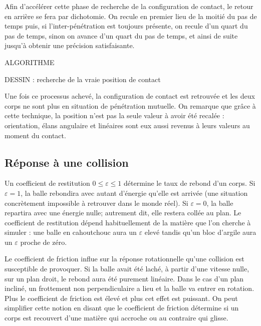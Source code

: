 Afin d'accélérer cette phase de recherche de la configuration de
contact, le retour en arrière se fera par dichotomie. On recule en
premier lieu de la moitié du pas de temps puis, si l'inter-pénétration
est toujours présente, on recule d'un quart du pas de temps, sinon on
avance d'un quart du pas de temps, et ainsi de suite jusqu'à obtenir
une précision satisfaisante.

ALGORITHME

DESSIN : recherche de la vraie position de contact

Une fois ce processus achevé, la configuration de contact est
retrouvée et les deux corps ne sont plus en situation de pénétration
mutuelle. On remarque que grâce à cette technique, la position n'est
pas la seule valeur à avoir été recalée : orientation, élans angulaire
et linéaires sont eux aussi revenus à leurs valeurs au moment du
contact.

\subsection{Réponse à une collision}

Un coefficient de restitution $0 \leq \varepsilon \leq 1$ détermine le
taux de rebond d'un corps. Si $\varepsilon = 1$, la balle rebondira
avec autant d'énergie qu'elle est arrivée (une situation concrètement
impossible à retrouver dans le monde réel). Si $\varepsilon = 0$, la
balle repartira avec une énergie nulle; autrement dit, elle restera
collée au plan. Le coefficient de restitution dépend habituellement de
la matière que l'on cherche à simuler : une balle en cahoutchouc aura
un $\varepsilon$ elevé tandis qu'un bloc d'argile aura un
$\varepsilon$ proche de zéro.

Le coefficient de friction influe sur la réponse rotationnelle qu'une
collision est susceptible de provoquer. Si la balle avait été laché, à
partir d'une vitesse nulle, sur un plan droit, le rebond aura été
purement linéaire. Dans le cas d'un plan incliné, un frottement non
perpendiculaire a lieu et la balle va entrer en rotation. Plus le
coefficient de friction est élevé et plus cet effet est puissant. On
peut simplifier cette notion en disant que le coefficient de friction
détermine si un corps est recouvert d'une matière qui accroche ou au
contraire qui glisse.

\cite{newton87}

